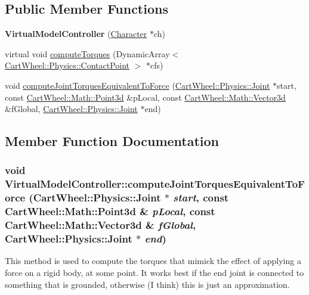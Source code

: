 \subsection*{Public Member Functions}
\begin{DoxyCompactItemize}
\item 
\hypertarget{classCartWheel_1_1Core_1_1VirtualModelController_a025763147935a31c9d88728373fcb332}{
{\bfseries VirtualModelController} (\hyperlink{classCartWheel_1_1Core_1_1Character}{Character} $\ast$ch)}
\label{classCartWheel_1_1Core_1_1VirtualModelController_a025763147935a31c9d88728373fcb332}

\item 
virtual void \hyperlink{classCartWheel_1_1Core_1_1VirtualModelController_ae4cf418528c2c3df886a552cb4eb14b2}{computeTorques} (DynamicArray$<$ \hyperlink{classCartWheel_1_1Physics_1_1ContactPoint}{CartWheel::Physics::ContactPoint} $>$ $\ast$cfs)
\item 
void \hyperlink{classCartWheel_1_1Core_1_1VirtualModelController_ab5866418db8f69510ae6de1a5437eda1}{computeJointTorquesEquivalentToForce} (\hyperlink{classCartWheel_1_1Physics_1_1Joint}{CartWheel::Physics::Joint} $\ast$start, const \hyperlink{classCartWheel_1_1Math_1_1Point3d}{CartWheel::Math::Point3d} \&pLocal, const \hyperlink{classCartWheel_1_1Math_1_1Vector3d}{CartWheel::Math::Vector3d} \&fGlobal, \hyperlink{classCartWheel_1_1Physics_1_1Joint}{CartWheel::Physics::Joint} $\ast$end)
\end{DoxyCompactItemize}


\subsection{Member Function Documentation}
\hypertarget{classCartWheel_1_1Core_1_1VirtualModelController_ab5866418db8f69510ae6de1a5437eda1}{
\subsubsection[{computeJointTorquesEquivalentToForce}]{\setlength{\rightskip}{0pt plus 5cm}void VirtualModelController::computeJointTorquesEquivalentToForce ({\bf CartWheel::Physics::Joint} $\ast$ {\em start}, \/  const {\bf CartWheel::Math::Point3d} \& {\em pLocal}, \/  const {\bf CartWheel::Math::Vector3d} \& {\em fGlobal}, \/  {\bf CartWheel::Physics::Joint} $\ast$ {\em end})}}
\label{classCartWheel_1_1Core_1_1VirtualModelController_ab5866418db8f69510ae6de1a5437eda1}
This method is used to compute the torques that mimick the effect of applying a force on a rigid body, at some point. It works best if the end joint is connected to something that is grounded, otherwise (I think) this is just an approximation.

